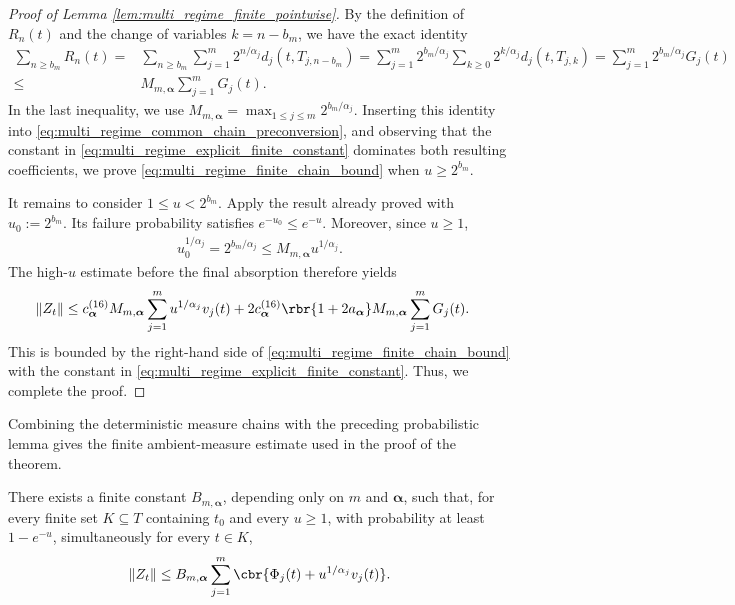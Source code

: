 \documentclass[11pt]{article}
\begin{document}
\begin{proof}[Proof of Lemma \ref{lem:multi_regime_finite_pointwise}]
By the definition of $R_n(t)$ and the change of variables
$k=n-b_m$, we have the exact identity
\begin{align*}
\sum_{n\ge b_m}R_n(t)=&
\sum_{n\ge b_m}
\sum_{j=1}^m
2^{n/\alpha_j}d_j(t,T_{j,n-b_m})=
\sum_{j=1}^m
2^{b_m/\alpha_j}
\sum_{k\ge0}2^{k/\alpha_j}d_j(t,T_{j,k})=
\sum_{j=1}^m
2^{b_m/\alpha_j}G_j(t)\\
\le&
M_{m,\boldsymbol\alpha}
\sum_{j=1}^mG_j(t).
\end{align*}
In the last inequality, we use $M_{m,\boldsymbol\alpha}=
\max_{1\le j\le m}2^{b_m/\alpha_j}$. Inserting this identity into
\eqref{eq:multi_regime_common_chain_preconversion}, and observing that
the constant in \eqref{eq:multi_regime_explicit_finite_constant}
dominates both resulting coefficients, we prove
\eqref{eq:multi_regime_finite_chain_bound} when
$u\ge2^{b_m}$.

It remains to consider $1\le u<2^{b_m}$. Apply the result already
proved with $u_0:=2^{b_m}$.
Its failure probability satisfies
$e^{-u_0}
\le
e^{-u}$.
Moreover, since $u\ge1$,
\begin{align*}
u_0^{1/\alpha_j}
=
2^{b_m/\alpha_j}
\le
M_{m,\boldsymbol\alpha}u^{1/\alpha_j}.
\end{align*}
The high-$u$ estimate before the final absorption therefore yields
\begin{align*}
\|Z_t\|
&\le
c_{\boldsymbol\alpha}^{(16)}
M_{m,\boldsymbol\alpha}
\sum_{j=1}^m u^{1/\alpha_j}v_j(t)+
2c_{\boldsymbol\alpha}^{(16)}
\rbr{1+2a_{\boldsymbol\alpha}}
M_{m,\boldsymbol\alpha}
\sum_{j=1}^mG_j(t).
\end{align*}
This is bounded by the right-hand side of
\eqref{eq:multi_regime_finite_chain_bound} with the constant in
\eqref{eq:multi_regime_explicit_finite_constant}. Thus, we complete the proof.
\end{proof}

Combining the deterministic measure chains with the preceding
probabilistic lemma gives the finite ambient-measure estimate used in the
proof of the theorem.

\begin{lemma}
\label{lem:multi_regime_finite_ambient_pointwise}
There exists a finite constant
$B_{m,\boldsymbol\alpha}$, depending only on $m$ and
$\boldsymbol\alpha$, such that, for every finite set
$K\subseteq T$ containing $t_0$ and every $u\ge1$, with probability
at least $1-e^{-u}$, simultaneously for every $t\in K$,
\begin{align}
\|Z_t\|
\le
B_{m,\boldsymbol\alpha}
\sum_{j=1}^m
\cbr{
\Phi_j(t)+u^{1/\alpha_j}v_j(t)
}.
\label{eq:multi_regime_finite_ambient_bound}
\end{align}
\end{lemma}
\end{document}
